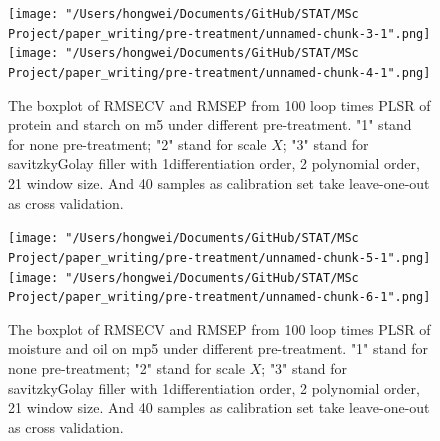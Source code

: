\documentclass[a4paper,12pt,titlepage]{article} %
\numberwithin{equation}{section}  %
\begin{document}
\begin{appendices}
			\begin{figure}[h]    %
	\centering           %
	\texttt{[image: "/Users/hongwei/Documents/GitHub/STAT/MSc Project/paper\_writing/pre-treatment/unnamed-chunk-3-1".png]}  %
	\texttt{[image: "/Users/hongwei/Documents/GitHub/STAT/MSc Project/paper\_writing/pre-treatment/unnamed-chunk-4-1".png]}  %
	\caption{The boxplot of RMSECV and RMSEP from 100 loop times PLSR of protein and starch on m5 under different pre-treatment. "1" stand for none pre-treatment; "2" stand for scale $X$; "3" stand for savitzkyGolay filler with 1differentiation order, 2 polynomial order, 21 window size. And 40 samples as calibration set take leave-one-out as cross validation.}          %
	\label{fig:pre-treatment-3-1}               %
\end{figure}                        %


			\begin{figure}[h]    %
	\centering           %
	\texttt{[image: "/Users/hongwei/Documents/GitHub/STAT/MSc Project/paper\_writing/pre-treatment/unnamed-chunk-5-1".png]}  %
	\texttt{[image: "/Users/hongwei/Documents/GitHub/STAT/MSc Project/paper\_writing/pre-treatment/unnamed-chunk-6-1".png]}  %
	\caption{The boxplot of RMSECV and RMSEP from 100 loop times PLSR of moisture and oil on mp5 under different pre-treatment. "1" stand for none pre-treatment; "2" stand for scale $X$; "3" stand for savitzkyGolay filler with 1differentiation order, 2 polynomial order, 21 window size. And 40 samples as calibration set take leave-one-out as cross validation.}          %
	\label{fig:pretreatment-5-1}               %
\end{figure}                        %


\end{appendices}
\end{document}

